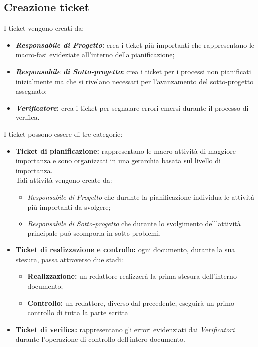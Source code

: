   \subsection{Creazione ticket}
    I ticket vengono creati da:
    \begin{itemize}
      \item \textbf{\emph{Responsabile di Progetto}: }crea i ticket più importanti che rappresentano le macro-fasi evideziate
      all'interno della pianificazione;
      \item \textbf{\emph{Responsabile di Sotto-progetto}: }crea i ticket per i processi non pianificati inizialmente ma che si rivelano necessari
      per l'avanzamento del sotto-progetto assegnato;
      \item \textbf{\emph{Verificatore}: }crea i ticket per segnalare errori emersi durante il processo di verifica.
    \end{itemize}
    I ticket possono essere di tre categorie:
    \begin{itemize}
      \item \textbf{Ticket di pianificazione: }rappresentano le macro-attività di maggiore importanza e sono organizzati in una gerarchia
      basata sul livello di importanza.\\
      Tali attività vengono create da:
      \bgroup
        \begin{itemize}
          \item \emph{Responsabile di Progetto} che durante la pianificazione individua le attività più importanti da svolgere;
          \item \emph{Responsabile di Sotto-progetto} che durante lo svolgimento dell'attività principale può scomporla in sotto-problemi.
        \end{itemize}
      \egroup
      \item \textbf{Ticket di realizzazione e controllo: }ogni documento, durante la sua stesura, passa attraverso due stadi:
      \bgroup
        \begin{itemize}
          \item \textbf{Realizzazione: }un redattore realizzerà la prima stesura dell'interno documento;
          \item \textbf{Controllo: }un redattore, diverso dal precedente, eseguirà un primo controllo di tutta la parte scritta.
        \end{itemize}
      \egroup
      \item \textbf{Ticket di verifica: }rappresentano gli errori evidenziati dai \emph{Verificatori} durante l'operazione di controllo dell'intero documento.
    \end{itemize}
